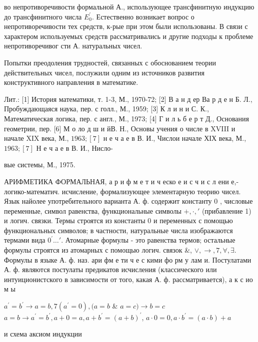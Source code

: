 \documentclass[10pt]{article}
\begin{document}
во непротиворечивости формальной А., использующее трансфинитную индукцию до трансфинитного числа $E_{0}^{\prime}$. Естественно возникает вопрос о непротиворечивости тех средств, к-рые при этом были использованы. В связи с характером используемых средств рассматривались и другие подходы к проблеме непротиворечивог сти А. натуральных чисел.



Попытки преодоления трудностей, связанных с обоснованием теории действительных чисел, послужили одним из источников развития конструктивного направления в математике.



Лит.: [1] История математики, т. 1-3, М., 1970-72; [2] В а н д ер Ва р д е н Б. Л., Пробуждающаяся наука, пер. с голл., М., 1959; [3] К л и н и С. К., Математическая логика, пер. с англ., М., 1973; [4] Г и л ь б е р т Д., Основания геометрии, пер. [6] М о ло д ш и йВ. Н., Основы учения о числе в XVIII и начале XIX века, М., $1963 ;[7]$ н е ч а е в В. И., Числои начале ХІХ века, М., $1963 ;[7]$ Н е ч а е в В. И., Нисло-

вые системы, М., 1975.



АРИФМЕТИКА ФОРМАЛЬНАЯ, а р и ф м е т и ч еско е и с ч и с л ени е,- логико-математич. исчисление, формализующее элементарную теорию чисел. Язык найолее употребительного варианта А. ф. содержит константу 0 , числовые переменные, символ равенства, функциональные символы $+, \cdot, '$ (прибавление 1) и логич. связки. Термы строятся из константы 0 и переменных с помощью функциональных символов; в частности, натуральные числа изображаются термами вида $0^{\prime} \ldots \prime$. Атомарные формулы - это равенства термов; остальные формулы строятся из атомарных с помощью логич. связок \&, $\vee, \rightarrow, 7, \forall, \exists$. Формулы в языке А. ф. наз. ари фм е ти ч е с кими фо рм у лам и. Постулатами А. ф. являются постулаты предикатов исчисления (классического или интуиционистского в зависимости от того, какая А. ф. рассматривается), а к с ио м ы



$a^{\prime}=b^{\prime} \longrightarrow a=b, 7\left(a^{\prime}=0\right),(a=b$ \& $a=c) \longrightarrow b=c$ $a=b \longrightarrow a^{\prime}=b^{\prime}, a+0=a, a+b^{\prime}=(a+b)^{\prime}$, $a \cdot 0=0, a \cdot b^{\prime}=(a \cdot b)+a$



и схема аксиом индукции
\end{document}
